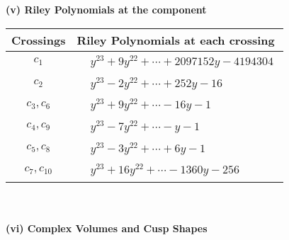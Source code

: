 \documentclass[1p]{elsarticle_modified}
\theoremstyle{definition}
\begin{document}
\newpage\renewcommand{\arraystretch}{1}
\flushleft \textbf{(v) Riley Polynomials at the component}\newline \\
\begin{tabular}{m{50pt}|m{274pt}}
Crossings & \hspace{64pt}Riley Polynomials at each crossing \\
\hline $$\begin{aligned}c_{1}\end{aligned}$$&$\begin{aligned}
&y^{23}+9 y^{22}+\cdots+2097152 y-4194304
\end{aligned}$\\
\hline $$\begin{aligned}c_{2}\end{aligned}$$&$\begin{aligned}
&y^{23}-2 y^{22}+\cdots+252 y-16
\end{aligned}$\\
\hline $$\begin{aligned}c_{3},c_{6}\end{aligned}$$&$\begin{aligned}
&y^{23}+9 y^{22}+\cdots-16 y-1
\end{aligned}$\\
\hline $$\begin{aligned}c_{4},c_{9}\end{aligned}$$&$\begin{aligned}
&y^{23}-7 y^{22}+\cdots- y-1
\end{aligned}$\\
\hline $$\begin{aligned}c_{5},c_{8}\end{aligned}$$&$\begin{aligned}
&y^{23}-3 y^{22}+\cdots+6 y-1
\end{aligned}$\\
\hline $$\begin{aligned}c_{7},c_{10}\end{aligned}$$&$\begin{aligned}
&y^{23}+16 y^{22}+\cdots-1360 y-256
\end{aligned}$\\
\hline
\end{tabular}\\~\\
\newpage\flushleft \textbf{(vi) Complex Volumes and Cusp Shapes}
\end{document}

